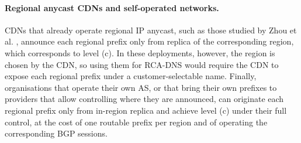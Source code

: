 \paragraph{Regional anycast CDNs and self-operated networks.} CDNs that already operate regional IP anycast, such as those studied by Zhou et al. \cite{Zhou2023RegionalPotentials}, announce each regional prefix only from replica of the corresponding region, which corresponds to level (c). In these deployments, however, the region is chosen by the CDN, so using them for RCA-DNS would require the CDN to expose each regional prefix under a customer-selectable name. Finally, organisations that operate their own AS, or that bring their own prefixes to providers that allow controlling where they are announced, can originate each regional prefix only from in-region replica and achieve level (c) under their full control, at the cost of one routable prefix per region and of operating the corresponding BGP sessions.

